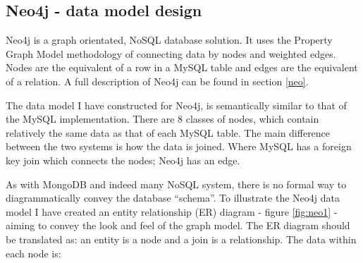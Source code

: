 \subsection{Neo4j - data model design}\label{neomodel}
Neo4j is a graph orientated, NoSQL database solution. It uses the Property Graph Model methodology of connecting data by nodes and weighted edges. Nodes are the equivalent of a row in a MySQL table and edges are the equivalent of a relation. A full description of Neo4j can be found in section \ref{neo}.

The data model I have constructed for Neo4j, is semantically similar to that of the MySQL implementation. There are 8 classes of nodes, which contain relatively the same data as that of each MySQL table. The main difference between the two systems is how the data is joined. Where MySQL has a foreign key join which connects the nodes; Neo4j has an edge.

As with MongoDB and indeed many NoSQL system, there is no formal way to diagrammatically convey the database ``schema''. To illustrate the Neo4j data model I have created an entity relationship (ER) diagram - figure \ref{fig:neo1} - aiming to convey the look and feel of the graph model. The ER diagram should be translated as: an entity is a node and a join is a relationship. The data within each node is:

